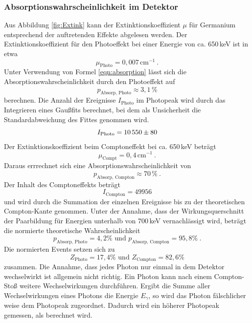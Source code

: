 \subsubsection{Absorptionswahrscheinlichkeit im Detektor}
Aus Abbildung \ref{fig:Extink} kann der Extinktionskoeffizient $\mu$ für Germanium entsprechend der auftretenden Effekte abgelesen werden. Der Extinktionskoeffizient für den Photoeffekt bei einer Energie von ca. 650\,keV ist in etwa
\begin{equation}
  \mu_\text{Photo} = 0,007 \, \text{cm} ^{-1} \ .
  \label{eqn:muPhoto}
\end{equation}
Unter Verwendung von Formel \ref{eqn:absorption} lässt sich die Absorptionswahrscheinlichkeit durch den Photoeffekt auf
\begin{equation}
  p_\text{Absorp, Photo} \approx 3,1 \, \%
  \label{eqn:AbsorpPhoto}
\end{equation}
berechnen. Die Anzahl der Ereignisse $I_\text{Photo}$ im Photopeak wird durch das Integrieren eines Gaußfits berechnet, bei dem als Unsicherheit die Standardabweichung des Fittes genommen wird.
\begin{equation}
  I_\text{Photo} = \num{10550 +- 80}
  \label{eqn:iPhoto}
\end{equation}
Der Extinktionskoeffizient beim Comptoneffekt bei ca. 650\,keV beträgt
\begin{equation}
  \mu_\text{Compt} = 0,4 \, \text{cm} ^{-1} \ .
  \label{eqn:muCompt}
\end{equation}
Daraus errrechnet sich eine Absorptionswahrscheinlichkeit von
\begin{equation}
  p_\text{Absorp, Compton} \approx 70 \, \% \ .
  \label{eqn:AbsorpComp}
\end{equation}
Der Inhalt des Comptoneffekts beträgt
\begin{equation}
  I_\text{Compton} = 49956
  \label{eqn:iComp}
\end{equation}
und wird durch die Summation der einzelnen Ereignisse bis zu der theoretischen Compton-Kante genommen. Unter der Annahme, dass der Wirkungsquerschnitt der Paarbildung für Energien unterhalb von 700\,keV vernachlässigt wird, beträgt die normierte theoretische Wahrscheinlichkeit
\begin{equation}
  p_\text{Absorp, Photo} = 4,2 \% \text{ und } p_\text{Absorp, Compton} = 95,8 \% \ .
  \label{eqn:pNorm}
\end{equation}
Die normierten Events setzen sich zu
\begin{equation}
  Z_\text{Photo} = 17,4 \% \text{ und } Z_\text{Compton} = 82,6 \%
  \label{eqn:expNorm}
\end{equation}
zusammen. Die Annahme, dass jedes Photon nur einmal in dem Detektor wechselwirkt ist allgemein nicht richtig. Ein Photon kann nach einem Compton-Stoß weitere Wechselwirkungen durchführen. Ergibt die Summe aller Wechselwirkungen eines Photons die Energie $E_\gamma$, so wird das Photon fälschlicher weise dem Photopeak zugeordnet. Dadurch wird ein höherer Photopeak gemessen, als berechnet wird.
